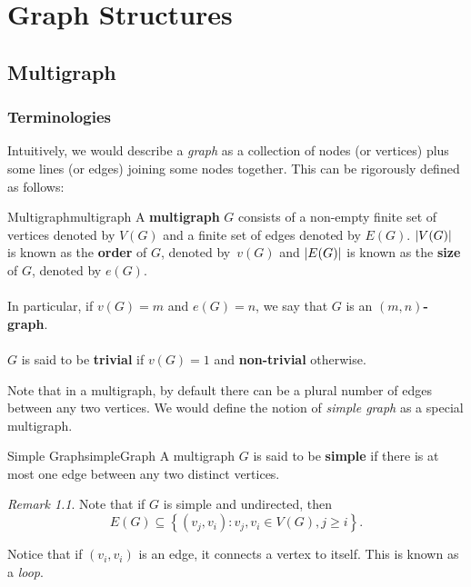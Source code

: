 \documentclass[math, code]{amznotes}
\theoremstyle{remark}
\newtheorem*{remark}{Remark}
\begin{document}
\tableofcontents

\chapter{Graph Structures}
\section{Multigraph}
\subsection{Terminologies}
Intuitively, we would describe a \textit{graph} as a collection of nodes (or vertices) plus some lines (or edges) joining some nodes together. This can be rigorously defined as follows:
\begin{dfnbox}{Multigraph}{multigraph}
    A {\color{red} \textbf{multigraph}} $G$ consists of a non-empty finite set of vertices denoted by $V(G)$ and a finite set of edges denoted by $E(G)$. ${\left\lvert {V(G)} \right\rvert}$ is known as the {\color{red} \textbf{order}} of $G$, denoted by~$v(G)$ and ${\left\lvert {E(G)} \right\rvert}$ is known as the {\color{red} \textbf{size}} of $G$, denoted by $e(G)$.
    \\\\
    In particular, if $v(G) = m$ and $e(G) = n$, we say that $G$ is an {\color{red} \textbf{$(m, n)$-graph}}.
    \\\\
    $G$ is said to be {\color{red} \textbf{trivial}} if $v(G) = 1$ and {\color{red} \textbf{non-trivial}} otherwise.
\end{dfnbox}
Note that in a multigraph, by default there can be a plural number of edges between any two vertices. We would define the notion of \textit{simple graph} as a special multigraph.
\begin{dfnbox}{Simple Graph}{simpleGraph}
    A multigraph $G$ is said to be {\color{red} \textbf{simple}} if there is at most one edge between any two distinct vertices.
\end{dfnbox}
\begin{notebox}
    \begin{remark}
        Note that if $G$ is simple and undirected, then
        \begin{displaymath}
            E(G) \subseteq \left\{(v_j, v_i) \colon v_j, v_i \in V(G), j \geq i\right\}.
        \end{displaymath}
    \end{remark}
\end{notebox}
Notice that if $(v_i, v_i)$ is an edge, it connects a vertex to itself. This is known as a \textit{loop}.
\end{document}
